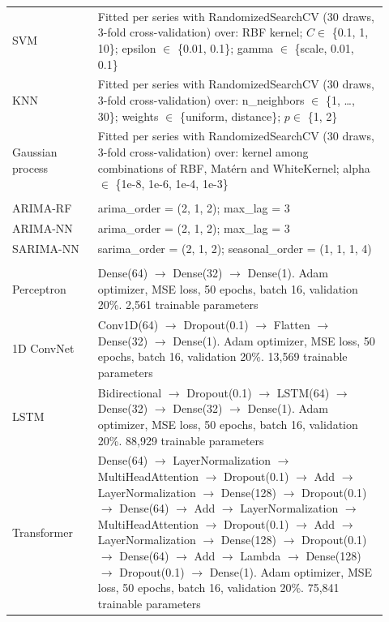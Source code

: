 \begin{longtable}{>{\raggedright\arraybackslash}p{0.21\linewidth}>{\raggedright\arraybackslash}p{0.71\linewidth}}
\hspace{.6em}SVM & Fitted per series with RandomizedSearchCV (30 draws, 3-fold cross-validation) over: RBF kernel; $C \in$ \{0.1, 1, 10\}; epsilon $\in$ \{0.01, 0.1\}; gamma $\in$ \{scale, 0.01, 0.1\} \\
\hspace{.6em}KNN & Fitted per series with RandomizedSearchCV (30 draws, 3-fold cross-validation) over: n\_neighbors $\in$ \{1, \dots, 30\}; weights $\in$ \{uniform, distance\}; $p \in$ \{1, 2\} \\
\hspace{.6em}Gaussian process & Fitted per series with RandomizedSearchCV (30 draws, 3-fold cross-validation) over: kernel among combinations of RBF, Mat\'ern and WhiteKernel; alpha $\in$ \{1e-8, 1e-6, 1e-4, 1e-3\} \\
\addlinespace
\multicolumn{2}{l}{\textit{Hybrid}} \\[1mm]
\hspace{.6em}ARIMA-RF & arima\_order = (2, 1, 2); max\_lag = 3 \\
\hspace{.6em}ARIMA-NN & arima\_order = (2, 1, 2); max\_lag = 3 \\
\hspace{.6em}SARIMA-NN & sarima\_order = (2, 1, 2); seasonal\_order = (1, 1, 1, 4) \\
\addlinespace
\multicolumn{2}{l}{\textit{Neural network}} \\[1mm]
\hspace{.6em}Perceptron & Dense(64) $\to$ Dense(32) $\to$ Dense(1). Adam optimizer, MSE loss, 50 epochs, batch 16, validation 20\%. 2,561 trainable parameters \\
\hspace{.6em}1D ConvNet & Conv1D(64) $\to$ Dropout(0.1) $\to$ Flatten $\to$ Dense(32) $\to$ Dense(1). Adam optimizer, MSE loss, 50 epochs, batch 16, validation 20\%. 13,569 trainable parameters \\
\hspace{.6em}LSTM & Bidirectional $\to$ Dropout(0.1) $\to$ LSTM(64) $\to$ Dense(32) $\to$ Dense(32) $\to$ Dense(1). Adam optimizer, MSE loss, 50 epochs, batch 16, validation 20\%. 88,929 trainable parameters \\
\hspace{.6em}Transformer & Dense(64) $\to$ LayerNormalization $\to$ MultiHeadAttention $\to$ Dropout(0.1) $\to$ Add $\to$ LayerNormalization $\to$ Dense(128) $\to$ Dropout(0.1) $\to$ Dense(64) $\to$ Add $\to$ LayerNormalization $\to$ MultiHeadAttention $\to$ Dropout(0.1) $\to$ Add $\to$ LayerNormalization $\to$ Dense(128) $\to$ Dropout(0.1) $\to$ Dense(64) $\to$ Add $\to$ Lambda $\to$ Dense(128) $\to$ Dropout(0.1) $\to$ Dense(1). Adam optimizer, MSE loss, 50 epochs, batch 16, validation 20\%. 75,841 trainable parameters \\

\end{longtable}
